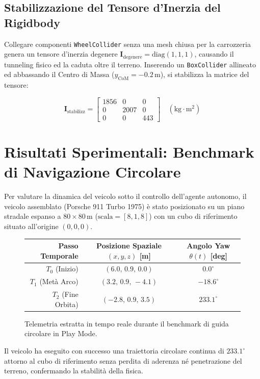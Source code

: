 \documentclass[11pt,a4paper]{article}
\begin{document}
\subsection{Stabilizzazione del Tensore d'Inerzia del Rigidbody}
Collegare componenti \texttt{WheelCollider} senza una mesh chiusa per la carrozzeria genera un tensore d'inerzia degenere $\mathbf{I}_{\text{degenere}} = \text{diag}(1, 1, 1)$, causando il tunneling fisico ed la caduta oltre il terreno. Inserendo un \texttt{BoxCollider} allineato ed abbassando il Centro di Massa ($y_{\text{CoM}} = -0.2\,\text{m}$), si stabilizza la matrice del tensore:

\begin{equation}
\mathbf{I}_{\text{stabilizz}} = \begin{bmatrix} 1856 & 0 & 0 \\ 0 & 2007 & 0 \\ 0 & 0 & 443 \end{bmatrix} \quad (\text{kg}\cdot\text{m}^2)
\end{equation}

\section{Risultati Sperimentali: Benchmark di Navigazione Circolare}

Per valutare la dinamica del veicolo sotto il controllo dell'agente autonomo, il veicolo assemblato (Porsche 911 Turbo 1975) è stato posizionato su un piano stradale espanso a $80 \times 80\,\text{m}$ ($\text{scala} = [8, 1, 8]$) con un cubo di riferimento situato all'origine $(0,0,0)$.

\begin{figure}[h!]
\centering
\small
\begin{tabular}{rcc}
\toprule
\textbf{Passo Temporale} & \textbf{Posizione Spaziale } $(x,y,z)$ [m] & \textbf{Angolo Yaw } $\theta(t)$ [deg] \\
\midrule
$T_0$ (Inizio) & $(6.0,\, 0.9,\, 0.0)$ & $0.0^\circ$ \\
$T_1$ (Metà Arco) & $(3.2,\, 0.9,\, -4.1)$ & $-18.6^\circ$ \\
$T_2$ (Fine Orbita) & $(-2.8,\, 0.9,\, 3.5)$ & \textbf{$233.1^\circ$} \\
\bottomrule
\end{tabular}
\caption{Telemetria estratta in tempo reale durante il benchmark di guida circolare in Play Mode.}
\end{figure}

Il veicolo ha eseguito con successo una traiettoria circolare continua di $233.1^\circ$ attorno al cubo di riferimento senza perdita di aderenza né penetrazione del terreno, confermando la stabilità della fisica.
\end{document}
